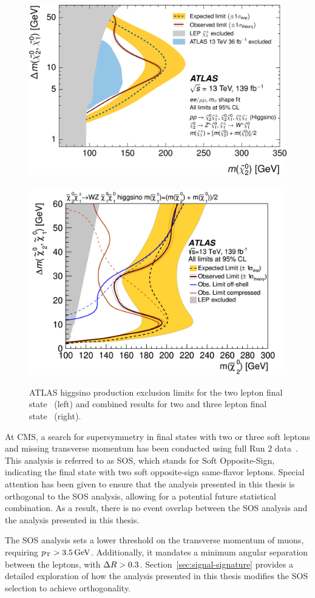 \begin{figure}[!htb]
\centering
\includegraphics[width=0.48\linewidth]{plots/prev_results/ATLAS_1911_12606.png} \,
\includegraphics[width=0.48\linewidth]{plots/prev_results/ATLAS-Higgsino-combined_2106_01676.png}  \\
\caption[ATLAS higgsino production exclusion limits]{ATLAS higgsino production exclusion limits for the two lepton final state~\cite{Aad_2020} (left) and combined results for two and three lepton final state~\cite{Aad:2771687} (right).}
\label{fig:atlas-limits}
\end{figure}

At CMS, a search for supersymmetry in final states with two or three soft leptons and missing transverse momentum has been conducted using full Run 2 data~\cite{sos}. This analysis is referred to as SOS, which stands for Soft Opposite-Sign, indicating the final state with two soft opposite-sign same-flavor leptons. Special attention has been given to ensure that the analysis presented in this thesis is orthogonal to the SOS analysis, allowing for a potential future statistical combination. As a result, there is no event overlap between the SOS analysis and the analysis presented in this thesis.

The SOS analysis sets a lower threshold on the transverse momentum of muons, requiring $p_{\mathrm{T}} > 3.5\,\text{Ge\hspace{-.08em}V}$. Additionally, it mandates a minimum angular separation between the leptons, with $\Delta R>0.3$. Section~\ref{sec:signal-signature} provides a detailed exploration of how the analysis presented in this thesis modifies the SOS selection to achieve orthogonality.

